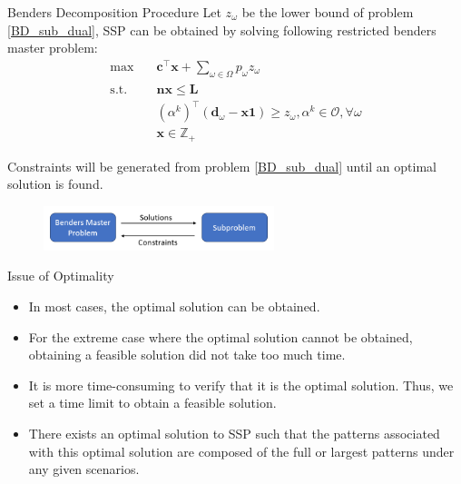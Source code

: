 \begin{frame}{Benders Decomposition Procedure}
  \small
  Let $z_{\omega}$ be the lower bound of problem \eqref{BD_sub_dual}, SSP can be obtained by solving following restricted benders master problem:
  \begin{equation}\label{BD_master2}
    \begin{aligned}
      \max \quad & \mathbf{c}^{\intercal} \mathbf{x} + \sum_{\omega \in \Omega} p_{\omega} z_{\omega} \\
      \text {s.t.} \quad & \mathbf{n} \mathbf{x} \leq \mathbf{L} \\
      & (\alpha^{k})^{\intercal}(\mathbf{d}_{\omega}- \mathbf{x} \mathbf{1}) \geq z_{\omega}, \alpha^k \in \mathcal{O}, \forall \omega \\
       & \mathbf{x} \in \mathbb{Z}_{+}
    \end{aligned}
\end{equation} 

  Constraints will be generated from problem \eqref{BD_sub_dual} until an optimal solution is found.

  \begin{figure}[ht]
    \centering
    \includegraphics[width = 0.6\textwidth]{./images/BD.png}
  \end{figure}
\end{frame}

\begin{frame}{Issue of Optimality}
  \begin{itemize}
  \item In most cases, the optimal solution can be obtained.
  \vspace{0.5cm}
  \item For the extreme case where the optimal solution cannot be obtained, obtaining a feasible solution did not take too much time. 
  \vspace{0.5cm}
  \item It is more time-consuming to verify that it is the optimal solution. Thus, we set a time limit to obtain a feasible solution.
  \vspace{0.5cm}
  \item There exists an optimal solution to SSP such that the patterns associated with this optimal solution are composed of the full or largest patterns under any given scenarios.
  \end{itemize}
\end{frame}


